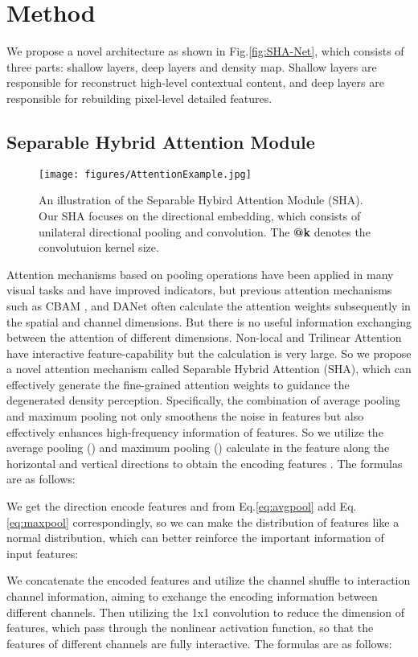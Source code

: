 \documentclass[final]{cvpr}
\begin{document}
\section{Method}
We propose a novel architecture as shown in Fig.\ref{fig:SHA-Net}, which consists of three parts: shallow layers, deep layers and density map. Shallow layers are responsible for reconstruct high-level contextual content, and deep layers are responsible for rebuilding pixel-level detailed features. 
\subsection{Separable Hybrid Attention Module}
\begin{figure}
    \centering
    \texttt{[image: figures/AttentionExample.jpg]}
    \caption{An illustration of the Separable Hybird Attention Module (SHA). Our SHA focuses on the directional embedding, which consists of unilateral directional pooling and convolution. The \textbf{@k} denotes the convolutuion kernel size.}
    \label{fig:sha_block}
\end{figure}
Attention mechanisms based on pooling operations have been applied in many visual tasks and have improved indicators, but previous attention mechanisms such as CBAM \cite{woo2018cbam}, and DANet \cite{fu2019dual} often calculate the attention weights subsequently in the spatial and channel dimensions. But there is no useful information exchanging between the attention of different dimensions. Non-local \cite{wang2018non} and Trilinear Attention \cite{zheng2019looking} have interactive feature-capability but the calculation is very large. So we propose a novel attention mechanism called Separable Hybrid Attention (SHA), which can effectively generate the fine-grained attention weights to guidance the degenerated density perception.
Specifically, the combination of average pooling and maximum pooling not only smoothens the noise in features but also effectively enhances high-frequency information of features. So we utilize the average pooling () and maximum pooling () calculate in the feature  along the horizontal and vertical directions to obtain the encoding features . The formulas are as follows:


We get the direction encode features  and   from  Eq.\ref{eq:avgpool} add Eq.\ref{eq:maxpool} correspondingly, so we can make the distribution of features like a normal distribution, which can better reinforce the important information of input features:

We concatenate the encoded features and utilize the channel shuffle to interaction channel information, aiming to exchange the encoding information between different channels. Then utilizing the 1x1 convolution to reduce the dimension of features, which pass through the nonlinear activation function, so that the features of different channels are fully interactive. The formulas are as follows:
\end{document}
